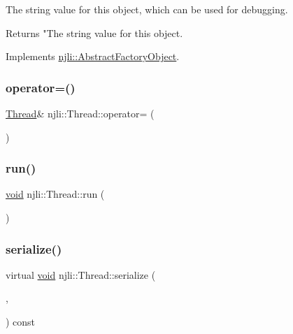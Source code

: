 The string value for this object, which can be used for debugging.

\begin{DoxyReturn}{Returns}
"The string value for this object. 
\end{DoxyReturn}


Implements \mbox{\hyperlink{classnjli_1_1_abstract_factory_object_a838f4fa7e65cace6098aab5222892942}{njli\+::\+Abstract\+Factory\+Object}}.

\mbox{\label{classnjli_1_1_thread_a6de32ea344863fe165a1200e36b36dc4}} 
\subsubsection{\texorpdfstring{operator=()}{operator=()}}
{\footnotesize\ttfamily \mbox{\hyperlink{classnjli_1_1_thread}{Thread}}\& njli\+::\+Thread\+::operator= (\begin{DoxyParamCaption}\item[{const \mbox{\hyperlink{classnjli_1_1_thread}{Thread}} \&}]{ }\end{DoxyParamCaption})\hspace{0.3cm}{\ttfamily [protected]}}

\mbox{\label{classnjli_1_1_thread_a14bd06414dc70facee0ec6840ab52c7b}} 
\subsubsection{\texorpdfstring{run()}{run()}}
{\footnotesize\ttfamily \mbox{\hyperlink{_thread_8h_af1e856da2e658414cb2456cb6f7ebc66}{void}} njli\+::\+Thread\+::run (\begin{DoxyParamCaption}{ }\end{DoxyParamCaption})}

\mbox{\label{classnjli_1_1_thread_ae1acf75828f1ab2ee4a0f818dc849292}} 
\subsubsection{\texorpdfstring{serialize()}{serialize()}}
{\footnotesize\ttfamily virtual \mbox{\hyperlink{_thread_8h_af1e856da2e658414cb2456cb6f7ebc66}{void}} njli\+::\+Thread\+::serialize (\begin{DoxyParamCaption}\item[{\mbox{\hyperlink{_thread_8h_af1e856da2e658414cb2456cb6f7ebc66}{void}} $\ast$}]{,  }\item[{bt\+Serializer $\ast$}]{ }\end{DoxyParamCaption}) const\hspace{0.3cm}{\ttfamily [virtual]}}

